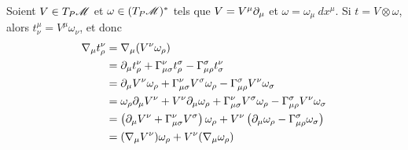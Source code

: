 \documentclass[a4paper,11pt]{report}
\begin{document}
                \begin{exmp}
                    Soient $V\in T_P\mathscr{M}$ et $\omega\in (T_P\mathscr{M})^*$ tels que $V = V^\mu\partial_\mu$ et $\omega = \omega_\mu~dx^\mu$. Si $t = V\otimes\omega$, alors $t^\mu_\nu = V^\mu\omega_\nu$, et donc
                    \begin{align}
                        \nabla_\mu t^\nu_\rho &= \nabla_\mu(V^\nu\omega_\rho)\\
                        &= \partial_\mu t^\nu_\rho + \Gamma^\nu_{\mu\sigma}t^\sigma_\rho - \Gamma^\sigma_{\mu\rho} t^\nu_{\sigma}\\
                        &= \partial_\mu V^\nu\omega_\rho + \Gamma^\nu_{\mu\sigma}V^\sigma\omega_\rho - \Gamma^\sigma_{\mu\rho} V^\nu\omega_\sigma\\
                        &= \omega_\rho\partial_\mu V^\nu + V^\nu\partial_\mu \omega_\rho + \Gamma^\nu_{\mu\sigma}V^\sigma\omega_\rho - \Gamma^\sigma_{\mu\rho} V^\nu\omega_\sigma\\
                        &= \left( \partial_\mu V^\nu + \Gamma^\nu_{\mu\sigma}V^\sigma \right)\omega_\rho + V^\nu\left( \partial_\mu \omega_\rho - \Gamma^\sigma_{\mu\rho}\omega_\sigma \right)\\
                        &= (\nabla_\mu V^\nu)\omega_\rho + V^\nu(\nabla_\mu\omega_\rho)
                    \end{align}
                \end{exmp}
                
\end{document}
